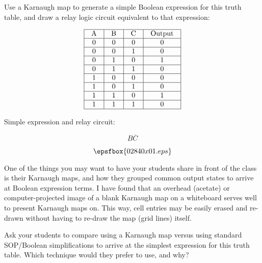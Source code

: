 

Use a Karnaugh map to generate a simple Boolean expression for this truth table, and draw a relay logic circuit equivalent to that expression:


$$\vbox{\offinterlineskip
\halign{\strut
\vrule \quad\hfil # \ \hfil & 
\vrule \quad\hfil # \ \hfil & 
\vrule \quad\hfil # \ \hfil & 
\vrule \quad\hfil # \ \hfil \vrule \cr
\noalign{\hrule}
%
A & B & C & Output \cr
%
\noalign{\hrule}
%
0 & 0 & 0 & 0 \cr
%
\noalign{\hrule}
%
0 & 0 & 1 & 0 \cr
%
\noalign{\hrule}
%
0 & 1 & 0 & 1 \cr
%
\noalign{\hrule}
%
0 & 1 & 1 & 0 \cr
%
\noalign{\hrule}
%
1 & 0 & 0 & 0 \cr
%
\noalign{\hrule}
%
1 & 0 & 1 & 0 \cr
%
\noalign{\hrule}
%
1 & 1 & 0 & 1 \cr
%
\noalign{\hrule}
%
1 & 1 & 1 & 0 \cr
%
\noalign{\hrule}
} %
}$$ %







Simple expression and relay circuit:

$$B \overline{C}$$

$$\epsfbox{02840x01.eps}$$







One of the things you may want to have your students share in front of the class is their Karnaugh maps, and how they grouped common output states to arrive at Boolean expression terms.  I have found that an overhead (acetate) or computer-projected image of a blank Karnaugh map on a whiteboard serves well to present Karnaugh maps on.  This way, cell entries may be easily erased and re-drawn without having to re-draw the map (grid lines) itself.

Ask your students to compare using a Karnaugh map versus using standard SOP/Boolean simplifications to arrive at the simplest expression for this truth table.  Which technique would they prefer to use, and why?




